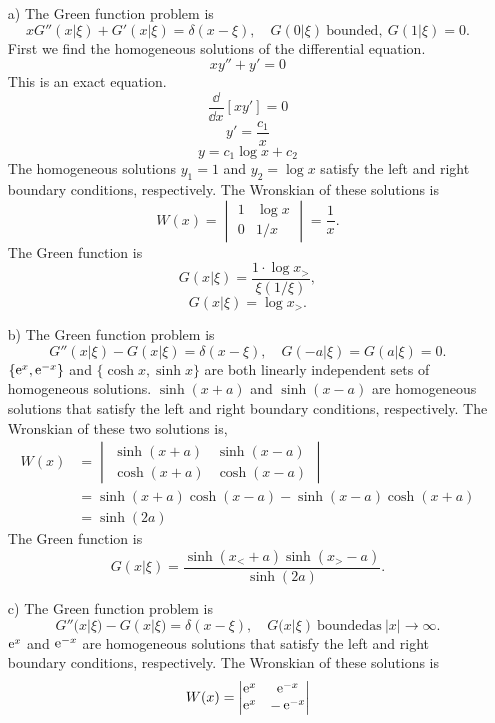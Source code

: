 {\begin{Solution}
  \begin{itemize}
  \item[a)]
    The Green function problem is
    \[
    x G''(x|\xi) + G'(x|\xi) = \delta(x-\xi), \quad G(0|\xi)\ \mathrm{bounded,}\ 
    G(1|\xi) = 0.
    \]
    First we find the homogeneous solutions of the differential equation.
    \[
    x y'' + y' = 0
    \]
    This is an exact equation.
    \[
    \frac{\dd}{\dd x} [ x y' ] = 0
    \]
    \[
    y' = \frac{c_1}{x}
    \]
    \[
    y = c_1 \log x + c_2
    \]
    The homogeneous solutions $y_1 = 1$ and $y_2 = \log x$ satisfy the left and
    right boundary conditions, respectively.  The Wronskian of these solutions
    is
    \[
    W(x) = \begin{vmatrix} 1 & \log x \\ 0 & 1/x \end{vmatrix}
    = \frac{1}{x}.
    \]
    The Green function is
    \[
    G(x|\xi) = \frac{ 1 \cdot \log x_> }{ \xi (1/\xi) },
    \]
    \[
    \boxed{
      G(x|\xi) = \log x_>.
      }
    \]
  \item[b)]
    The Green function problem is
    \[
    G''(x|\xi) - G(x|\xi) = \delta(x-\xi), \quad
    G(-a|\xi) = G(a|\xi) = 0.
    \]
    $\{\mathop{\mathrm{e}}\nolimits^x, \mathop{\mathrm{e}}\nolimits^{-x}\}$ and $\{ \cosh x, \sinh x\}$ are both linearly independent
    sets of homogeneous solutions.  $\sinh(x+a)$ and $\sinh(x-a)$ are homogeneous
    solutions that satisfy the left and right boundary conditions, respectively.
    The Wronskian of these two solutions is,
    \begin{align*}
      W(x)    &= \begin{vmatrix} \sinh(x+a) & \sinh(x-a) \\
        \cosh(x+a) & \cosh(x-a) \end{vmatrix} \\
      &= \sinh(x+a) \cosh(x-a) - \sinh(x-a) \cosh(x+a)  \\
      &= \sinh(2 a)
    \end{align*}
    The Green function is
    \[
    \boxed{
      G(x|\xi) = \frac{ \sinh(x_< + a) \sinh(x_> - a) }{ \sinh(2 a) }.
      }
    \]
  \item[c)]
    The Green function problem is
    \[
    G''(x|\xi) - G(x|\xi) = \delta(x - \xi), \quad
    G(x|\xi)\ \mathrm{bounded as}\ |x| \to \infty.
    \]
    $\mathop{\mathrm{e}}\nolimits^{x}$ and $\mathop{\mathrm{e}}\nolimits^{-x}$ are homogeneous solutions that satisfy the left 
    and right boundary conditions, respectively.  The Wronskian of these solutions
    is
    \[
    W(x) = \begin{vmatrix} \mathop{\mathrm{e}}\nolimits^x & \mathop{\mathrm{e}}\nolimits^{-x} \\ \mathop{\mathrm{e}}\nolimits^x & - \mathop{\mathrm{e}}\nolimits^{-x} \end{vmatrix}
\]
\end{itemize}
\end{Solution}}

